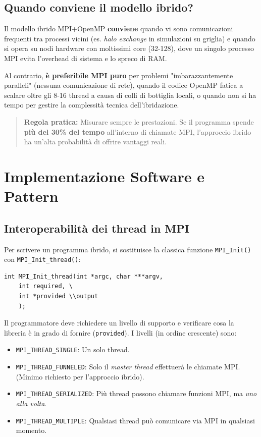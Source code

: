 \subsection{Quando conviene il modello ibrido?}
Il modello ibrido MPI+OpenMP \textbf{conviene} quando vi sono comunicazioni frequenti tra processi vicini (es. \textit{halo exchange} in simulazioni su griglia) e quando si opera su nodi hardware con moltissimi core (32-128), dove un singolo processo MPI evita l'overhead di sistema e lo spreco di RAM.

Al contrario, \textbf{è preferibile MPI puro} per problemi "imbarazzantemente paralleli" (nessuna comunicazione di rete), quando il codice OpenMP fatica a scalare oltre gli 8-16 thread a causa di colli di bottiglia locali, o quando non si ha tempo per gestire la complessità tecnica dell'ibridazione.
\begin{quote}
    \textbf{Regola pratica:} Misurare sempre le prestazioni. Se il programma spende \textbf{più del 30\% del tempo} all'interno di chiamate MPI, l'approccio ibrido ha un'alta probabilità di offrire vantaggi reali.
\end{quote}


\section{Implementazione Software e Pattern}

\subsection{Interoperabilità dei thread in MPI}
Per scrivere un programma ibrido, si sostituisce la classica funzione \texttt{MPI\_Init()} con \texttt{MPI\_Init\_thread()}:
\begin{verbatim}
int MPI_Init_thread(int *argc, char ***argv, 
    int required, \
    int *provided \\output
    );
\end{verbatim}
Il programmatore deve richiedere un livello di supporto e verificare cosa la libreria è in grado di fornire (\texttt{provided}). I livelli (in ordine crescente) sono:
\begin{itemize}
    \item \texttt{MPI\_THREAD\_SINGLE}: Un solo thread.
    \item \texttt{MPI\_THREAD\_FUNNELED}: Solo il \textit{master thread} effettuerà le chiamate MPI. (Minimo richiesto per l'approccio ibrido).
    \item \texttt{MPI\_THREAD\_SERIALIZED}: Più thread possono chiamare funzioni MPI, ma \textit{uno alla volta}.
    \item \texttt{MPI\_THREAD\_MULTIPLE}: Qualsiasi thread può comunicare via MPI in qualsiasi momento.
\end{itemize}

